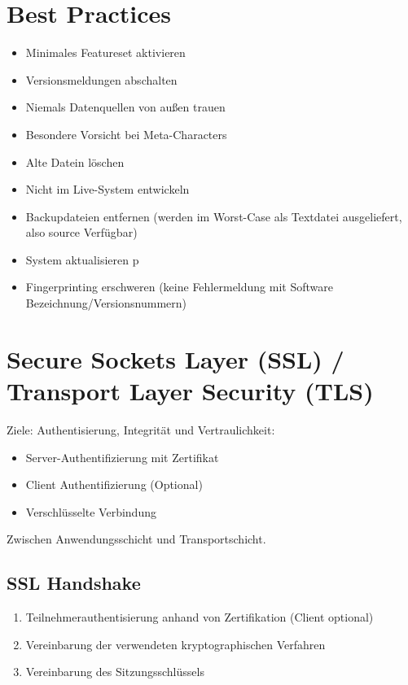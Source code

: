 \section{Best Practices}
\begin{itemize}
    \item Minimales Featureset aktivieren
    \item Versionsmeldungen abschalten
    \item Niemals Datenquellen von außen trauen
    \item Besondere Vorsicht bei Meta-Characters
    \item Alte Datein löschen
    \item Nicht im Live-System entwickeln
    \item Backupdateien entfernen (werden im Worst-Case als Textdatei ausgeliefert, also source Verfügbar)
    \item System aktualisieren
p   \item Fingerprinting erschweren (keine Fehlermeldung mit Software Bezeichnung/Versionsnummern)
\end{itemize}

\section{Secure Sockets Layer (SSL) / Transport Layer Security (TLS)}
Ziele: Authentisierung, Integrität und Vertraulichkeit:
\begin{itemize}
    \item Server-Authentifizierung mit Zertifikat
    \item Client Authentifizierung (Optional)
    \item Verschlüsselte Verbindung
\end{itemize}

Zwischen Anwendungsschicht und Transportschicht.

\subsection{SSL Handshake}
\begin{enumerate}
    \item Teilnehmerauthentisierung anhand von Zertifikation (Client optional)
    \item Vereinbarung der verwendeten kryptographischen Verfahren
    \item Vereinbarung des Sitzungsschlüssels
\end{enumerate}

